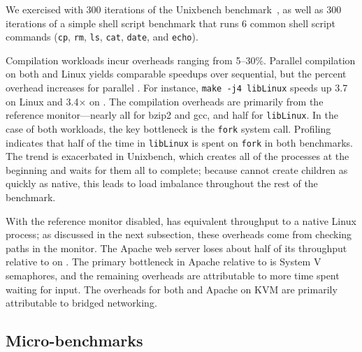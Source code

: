 We exercised \busy{} with 
300 iterations of the Unixbench benchmark~\cite{unixbench}, as well as 
300 iterations of a simple shell script benchmark that runs 6 common shell script commands
({\tt cp}, {\tt rm}, {\tt ls}, {\tt cat}, {\tt date}, and {\tt echo}).

Compilation workloads incur overheads ranging from 5--30\%.
Parallel compilation on both \graphene{} and Linux yields comparable  speedups  over sequential,
but the percent overhead increases for parallel \graphene{}.
For instance, {\tt make -j4 libLinux} speeds up 3.7\x{} on Linux and 3.4$\times$ on \graphene{}.
The compilation overheads are primarily from the reference monitor---nearly all for bzip2 and gcc, and half for {\tt libLinux}.
In the case of both \busy{} workloads, the key bottleneck is the {\tt fork} system call.
Profiling indicates that half of the time in {\tt libLinux} is spent on {\tt fork} in both benchmarks.
The trend is exacerbated in Unixbench, which creates all of the processes at the beginning and
waits for them all to complete; because \graphene{} cannot create children as quickly as native, this leads to 
load imbalance throughout the rest of the benchmark.  

With the reference monitor disabled,  \light{} has equivalent throughput to a native Linux process;
as discussed in the next subsection, these overheads come from checking paths in the monitor.
The Apache web server loses about half of its throughput relative to \light{} on \graphene{}.
The primary bottleneck in Apache relative to \light{} is System V semaphores,
and the remaining overheads are attributable to more time spent waiting for input.
The overheads for both \light{} and Apache on KVM are primarily attributable
to bridged networking.





\subsection{Micro-benchmarks}
\label{sec:eval:graphene:mbench}

